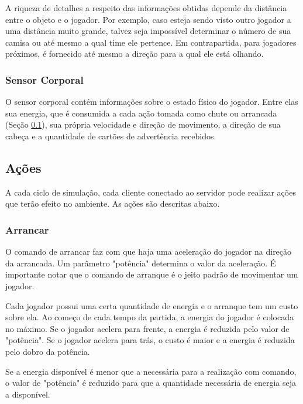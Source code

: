 A riqueza de detalhes a respeito das informações obtidas depende da distância entre o objeto e o jogador. Por exemplo, caso esteja sendo visto outro jogador a uma distância muito grande, talvez seja impossível determinar o número de sua camisa ou até mesmo a qual time ele pertence. Em contrapartida, para jogadores próximos, é fornecido até mesmo a direção para a qual ele está olhando.

\subsubsection{Sensor Corporal}

O sensor corporal contém informações sobre o estado físico do jogador. Entre elas sua energia, que é consumida a cada ação tomada como chute ou arrancada (Seção \ref{sec:actions}), sua própria velocidade e direção de movimento, a direção de sua cabeça e a quantidade de cartões de advertência recebidos.

\subsection{Ações}
\label{sec:actions}


A cada ciclo de simulação, cada cliente conectado ao servidor pode realizar ações que terão efeito no ambiente. As ações são descritas abaixo. \cite{rcssmanual2003}

\subsubsection{Arrancar}
\label{sec:dash}

O comando de arrancar faz com que haja uma aceleração do jogador na direção da arrancada. Um parâmetro "potência" determina o valor da aceleração. É importante notar que o comando de arranque é o jeito padrão de movimentar um jogador.

Cada jogador possui uma certa quantidade de energia e o arranque tem um custo sobre ela. Ao começo de cada tempo da partida, a energia do jogador é colocada no máximo. Se o jogador acelera para frente, a energia é reduzida pelo valor de "potência". Se o jogador acelera para trás, o custo é maior e a energia é reduzida pelo dobro da potência.

Se a energia disponível é menor que a necessária para a realização com comando, o valor de "potência" é reduzido para que a quantidade necessária de energia seja a disponível.

